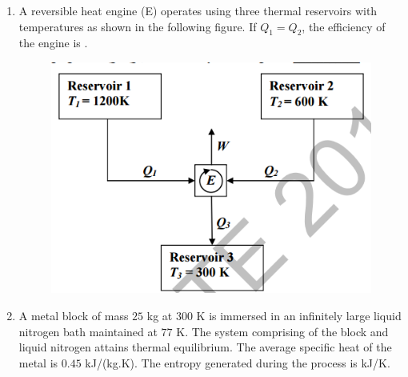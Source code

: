 \documentclass[a4paper,10pt]{article}
\begin{document}
\begin{enumerate}
    \item A reversible heat engine (E) operates using three thermal reservoirs with temperatures as shown in the following figure. If $Q_1 = Q_2$, the efficiency of the engine is \underline{\hspace{2cm}}.
    \begin{figure}[H] \centering \includegraphics[width=0.6\columnwidth]{q12_thermo.png} \caption*{} \label{fig:q12_thermo} \end{figure}
    
    \hfill{}
    \begin{enumerate}[label=\Alph*)]
    \end{enumerate}
    
    \item A metal block of mass $25$ kg at $300$ K is immersed in an infinitely large liquid nitrogen bath maintained at $77$ K. The system comprising of the block and liquid nitrogen attains thermal equilibrium. The average specific heat of the metal is $0.45$ kJ/(kg.K). The entropy generated during the process is \underline{\hspace{2cm}} kJ/K.
    
    \hfill{}
    \begin{enumerate}[label=\Alph*)]
    \end{enumerate}


\end{enumerate}
\end{document}
